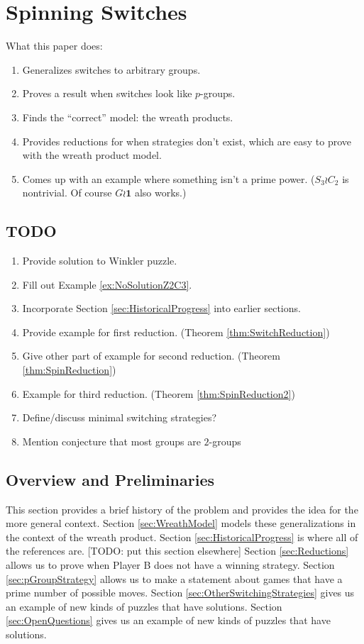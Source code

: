 \chapter{Spinning Switches}
\label{cha:research_topic_1}

What this paper does:
\begin{enumerate}
  \item Generalizes switches to arbitrary groups.
  \item Proves a result when switches look like $p$-groups.
  \item Finds the ``correct'' model: the wreath products.
  \item Provides reductions for when strategies don't exist, which are easy to prove with the wreath product model.
  \item Comes up with an example where something isn't a prime power. ($S_3 \wr C_2$ is nontrivial. Of course $G \wr \mathbf{1}$ also works.)
\end{enumerate}

\section{TODO}
\begin{enumerate}
  \item Provide solution to Winkler puzzle.
  \item Fill out Example \ref{ex:NoSolutionZ2C3}.
  \item Incorporate Section \ref{sec:HistoricalProgress} into earlier sections.
  \item Provide example for first reduction. (Theorem \ref{thm:SwitchReduction})
  \item Give other part of example for second reduction. (Theorem \ref{thm:SpinReduction})
  \item Example for third reduction. (Theorem \ref{thm:SpinReduction2})
  \item Define/discuss minimal switching strategies?
  \item Mention conjecture that most groups are $2$-groups
\end{enumerate}

\section{Overview and Preliminaries}
This section provides a brief history of the problem and provides the idea for the more general context.
Section \ref{sec:WreathModel} models these generalizations in the context of the wreath product.
Section \ref{sec:HistoricalProgress} is where all of the references are. [TODO: put this section elsewhere]
Section \ref{sec:Reductions} allows us to prove when Player B does not have a winning strategy.
Section \ref{sec:pGroupStrategy} allows us to make a statement about games that have a prime number of possible moves.
Section \ref{sec:OtherSwitchingStrategies} gives us an example of new kinds of puzzles that have solutions.
Section \ref{sec:OpenQuestions} gives us an example of new kinds of puzzles that have solutions.

